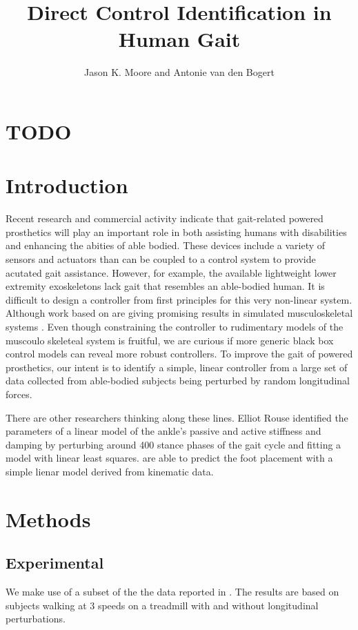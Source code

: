 \documentclass{article}
\author{Jason K. Moore and Antonie van den Bogert}
\title{Direct Control Identification in Human Gait}
\date{}
\begin{document}
\section*{TODO}

\listoftodos

\section*{Introduction}
%
Recent research and commercial activity indicate that gait-related powered
prosthetics will play an important role in both assisting humans with
disabilities and enhancing the abities of able bodied. These devices include a
variety of sensors and actuators than can be coupled to a control system to
provide acutated gait assistance. However, for example, the available
lightweight lower extremity exoskeletons lack gait that resembles an
able-bodied human. It is difficult to design a controller from first principles
for this very non-linear system. Although work based on \cite{Geyer2010} are
giving promising results in simulated musculoskeletal systems \cite{Wang2010,
Geitenbeek2014}. Even though constraining the controller to rudimentary models
of the muscoulo skeleteal system is fruitful, we are curious if more generic
black box control models can reveal more robust controllers. To improve the
gait of powered prosthetics, our intent is to identify a simple, linear
controller from a large set of data collected from able-bodied subjects being
perturbed by random longitudinal forces.

There are other researchers thinking along these lines. Elliot Rouse identified
the parameters of a linear model of the ankle's passive and active stiffness
and damping by perturbing around 400 stance phases of the gait cycle and
fitting a model with linear least squares. \cite{Wang2013} are able to predict
the foot placement with a simple lienar model derived from kinematic data.
%
\section*{Methods}
%
\subsection{Experimental}
%
We make use of a subset of the the data reported in \cite{Moore2015}. The
results are based on  subjects walking at 3 speeds on
a treadmill with and without longitudinal perturbations.
\end{document}
